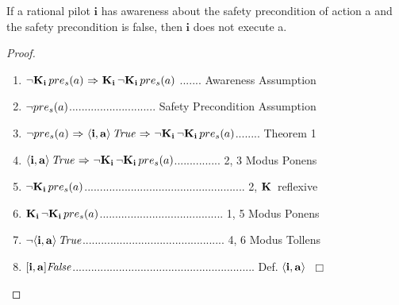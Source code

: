 \begin{theorem}
	\label{awareness}
	If a rational pilot $\mathbf{i}$ has awareness about the safety precondition of action a and the safety precondition is false, then $\mathbf{i}$ does not execute a.
\end{theorem}

\begin{proof}\mbox{}
	\begin{enumerate}
		\item ${\neg} \mathbf{K}_{\mathbf{i}}\, pre_s(a) {\ \Rightarrow \ } \mathbf{K}_{\mathbf{i}}\,{\neg} \mathbf{K}_{\mathbf{i}}\,pre_s(a)$ ....... Awareness Assumption
		\item ${\neg} pre_s(a)$............................ Safety Precondition Assumption
		\item ${\neg} pre_s(a) {\ \Rightarrow \ } \mathbf{\langle i, a \rangle}\,\mathit{True} {\ \Rightarrow \ } {\neg} \mathbf{K}_{\mathbf{i}}\,{\neg} \mathbf{K}_{\mathbf{i}}\,pre_s(a)$........ Theorem 1
		\item $\mathbf{\langle i, a \rangle}\,\mathit{True} {\ \Rightarrow \ } {\neg} \mathbf{K}_{\mathbf{i}}\,{\neg} \mathbf{K}_{\mathbf{i}}\,pre_s(a)$............... 2, 3 Modus Ponens
		\item ${\neg} \mathbf{K}_{\mathbf{i}}\,pre_s(a)$.................................................... 2, $\mathbf{K}\,$ reflexive
		\item $\mathbf{K}_{\mathbf{i}}\,{\neg}\mathbf{K}_{\mathbf{i}}\,pre_s(a)$........................................ 1, 5 Modus Ponens
		\item ${\neg} \mathbf{\langle i, a \rangle}\,\mathit{True}$.............................................. 4, 6 Modus Tollens
		\item $\mathbf{[{i, a}]}\mathit{False}$........................................................... Def. $\mathbf{\langle i, a \rangle}\,$  $\Box$
	\end{enumerate}
\end{proof}

